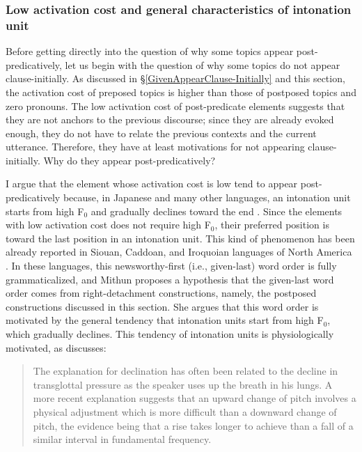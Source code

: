 \subsubsection{Low activation cost and general characteristics of intonation unit}\label{WO:PostP:Motivations:IU}

Before getting directly into the question of
why some topics appear post-predicatively,
let us begin with the question of why some topics do not appear clause-initially.
As discussed in \S \ref{GivenAppearClause-Initially} and this section,
the activation cost of preposed topics is higher than
those of postposed topics and zero pronouns.
The low activation cost of post-predicate elements suggests that
they are not anchors to the previous discourse;
since they are already evoked enough,
they do not have to relate the previous contexts and the current utterance.
Therefore, they have at least motivations for not appearing clause-initially.
Why do they appear post-predicatively?

I argue that the element whose activation cost is low tend to appear post-predicatively
because, in Japanese and many other languages,
an intonation unit starts from high F$_{0}$ and gradually declines toward the end 
\cite{libermanpierrehumbert84,cruttenden86,duboisetal93,chafe94,prieto96,truckenbrodt04,denetal10}.
Since the elements with low activation cost does not require high F$_{0}$,
their preferred position is toward the last position in an intonation unit.
This kind of phenomenon has been already reported in Siouan, Caddoan, and Iroquoian languages of North America \cite{mithun95}.
In these languages,
this newsworthy-first (i.e., given-last) word order is fully grammaticalized, and Mithun proposes a hypothesis that the given-last word order comes from right-detachment constructions, namely, the postposed constructions discussed in this section.
She argues that this word order is motivated by the general tendency that intonation units start from high F$_{0}$, which gradually declines.
This tendency of intonation units is physiologically motivated,
as  discusses:
%
\begin{quote}
The explanation for declination has often been related to the decline in transglottal pressure as the speaker uses up the breath in his lungs.
A more recent explanation suggests that an upward change of pitch involves a physical adjustment which is more difficult than a downward change of pitch,
the evidence being that a rise takes longer to achieve than a fall of a similar interval in fundamental frequency.
\cite[][p.~168]{cruttenden86}
\end{quote}
%

